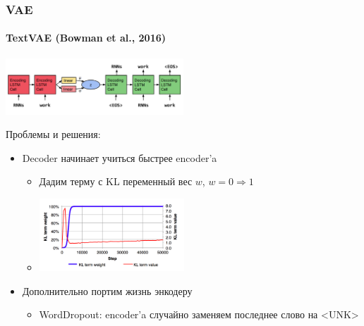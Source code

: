 \documentclass[10pt]{beamer}
\begin{document}
\begin{frame}
\frametitle{VAE}
\framesubtitle{TextVAE (Bowman et al., 2016)}

\begin{center}
    \includegraphics[width=0.5\textwidth]{images/text_vae.png}
\end{center}

Проблемы и решения:
\begin{itemize}
    \item Decoder начинает учиться быстрее encoder'a
    \begin{itemize}
        \item Дадим терму с KL переменный вес $w$, $w = 0 \Rightarrow 1$
        \item \includegraphics[width=0.45\textwidth]{images/kl_term_w.png}
    \end{itemize}
    \item Дополнительно портим жизнь энкодеру
    \begin{itemize}
        \item WordDropout: encoder'a случайно заменяем последнее слово на <UNK>
    \end{itemize}
\end{itemize}

\end{frame}
\end{document}
